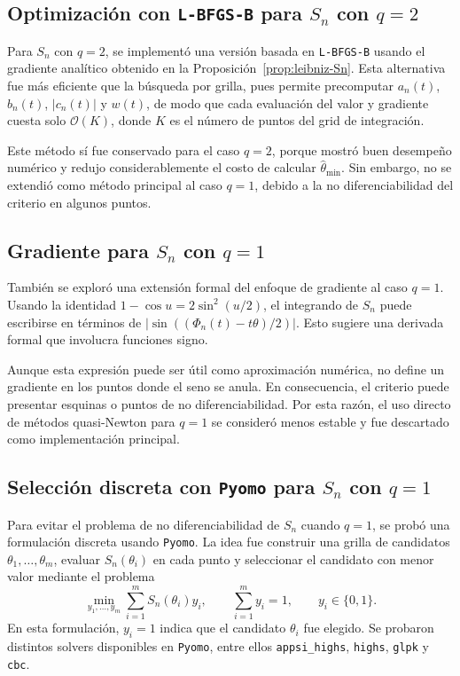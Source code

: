 \subsection*{Optimización con \texorpdfstring{\texttt{L-BFGS-B}}{L-BFGS-B} para \texorpdfstring{$S_n$}{Sn} con \texorpdfstring{$q=2$}{q=2}}

Para \(S_n\) con \(q=2\), se implementó una versión basada en \texttt{L-BFGS-B} usando el gradiente analítico obtenido en la Proposición~\ref{prop:leibniz-Sn}. Esta alternativa fue más eficiente que la búsqueda por grilla, pues permite precomputar \(a_n(t)\), \(b_n(t)\), \(|c_n(t)|\) y \(w(t)\), de modo que cada evaluación del valor y gradiente cuesta solo \(\mathcal O(K)\), donde \(K\) es el número de puntos del grid de integración.

Este método sí fue conservado para el caso \(q=2\), porque mostró buen desempeño numérico y redujo considerablemente el costo de calcular \(\hat\theta_{\min}\). Sin embargo, no se extendió como método principal al caso \(q=1\), debido a la no diferenciabilidad del criterio en algunos puntos.

\subsection*{Gradiente para \texorpdfstring{$S_n$}{Sn} con \texorpdfstring{$q=1$}{q=1}}

También se exploró una extensión formal del enfoque de gradiente al caso \(q=1\). Usando la identidad \(1-\cos u=2\sin^2(u/2)\), el integrando de \(S_n\) puede escribirse en términos de \(\left|\sin((\Phi_n(t)-t\theta)/2)\right|\). Esto sugiere una derivada formal que involucra funciones signo.

Aunque esta expresión puede ser útil como aproximación numérica, no define un gradiente en los puntos donde el seno se anula. En consecuencia, el criterio puede presentar esquinas o puntos de no diferenciabilidad. Por esta razón, el uso directo de métodos quasi-Newton para \(q=1\) se consideró menos estable y fue descartado como implementación principal.

\subsection*{Selección discreta con \texorpdfstring{\texttt{Pyomo}}{Pyomo} para \texorpdfstring{$S_n$}{Sn} con \texorpdfstring{$q=1$}{q=1}}

Para evitar el problema de no diferenciabilidad de \(S_n\) cuando \(q=1\), se probó una formulación discreta usando \texttt{Pyomo}. La idea fue construir una grilla de candidatos \(\theta_1,\dots,\theta_m\), evaluar \(S_n(\theta_i)\) en cada punto y seleccionar el candidato con menor valor mediante el problema
\[
\min_{y_1,\dots,y_m}\sum_{i=1}^m S_n(\theta_i)y_i,
\qquad
\sum_{i=1}^m y_i=1,
\qquad
y_i\in\{0,1\}.
\]
En esta formulación, \(y_i=1\) indica que el candidato \(\theta_i\) fue elegido. Se probaron distintos solvers disponibles en \texttt{Pyomo}, entre ellos \texttt{appsi\_highs}, \texttt{highs}, \texttt{glpk} y \texttt{cbc}.

